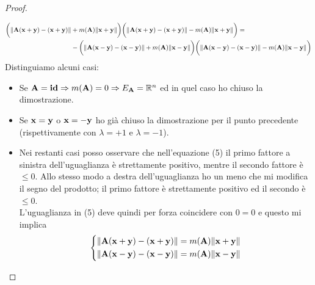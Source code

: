 \documentclass[10pt,a4paper]{article}
\begin{document}
\begin{proof}
\begin{itemize}
\begin{equation}
\begin{split}
\bigg( \norm{\vb{A(x+y) - (x+y)}} & + m(\vb{A})\norm{\vb{x+y}} \bigg) \bigg( \norm{\vb{A(x+y) - (x+y)}} - m(\vb{A}) \norm{\vb{x+y}} \bigg) = \\
& -\bigg( \norm{\vb{A(x-y) - (x-y)}} + m(\vb{A})\norm{\vb{x-y}} \bigg) \bigg( \norm{\vb{A(x-y) - (x-y)}} - m(\vb{A}) \norm{\vb{x-y}} \bigg)
\end{split}
\end{equation}
Distinguiamo alcuni casi: 
\begin{itemize}
\item Se $\vb{A} = \vb{id} \Rightarrow m(\vb{A}) = 0 \Rightarrow E_{\vb{A}} = \mathbb{R}^{n}$  ed in quel caso ho chiuso la dimostrazione.
\item Se $\vb{x} = \vb{y}$ o $\vb{x} = \vb{-y}$  ho già chiuso la dimostrazione per il punto precedente (rispettivamente con $\lambda = +1$ e $\lambda = -1$). 
\item Nei restanti casi posso osservare che nell'equazione (5) il primo fattore a sinistra dell'uguaglianza è strettamente positivo, mentre il secondo fattore è $\leq 0 $. Allo stesso modo a destra dell'uguaglianza ho un meno che mi modifica il segno del prodotto; il primo fattore è strettamente positivo ed il secondo è $\leq 0 $. \\ L'uguaglianza in (5) deve quindi per forza coincidere con $0=0$ e questo mi implica 
\begin{equation*}
  \left\{
    \begin{aligned}
      & \norm{\vb{A(x+y) - (x+y)}} = m(\vb{A})\norm{\vb{x+y}} \\
      & \norm{\vb{A(x-y) - (x-y)}} = m(\vb{A})\norm{\vb{x-y}} 
    \end{aligned}
  \right.
\end{equation*}


\end{itemize}
\end{itemize}
\end{proof}
\end{document}
